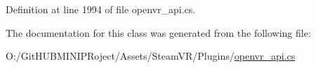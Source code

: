 Definition at line 1994 of file openvr\+\_\+api.\+cs.



The documentation for this class was generated from the following file\+:\begin{DoxyCompactItemize}
\item 
O\+:/\+Git\+H\+U\+B\+M\+I\+N\+I\+P\+Roject/\+Assets/\+Steam\+V\+R/\+Plugins/\mbox{\hyperlink{openvr__api_8cs}{openvr\+\_\+api.\+cs}}\end{DoxyCompactItemize}
